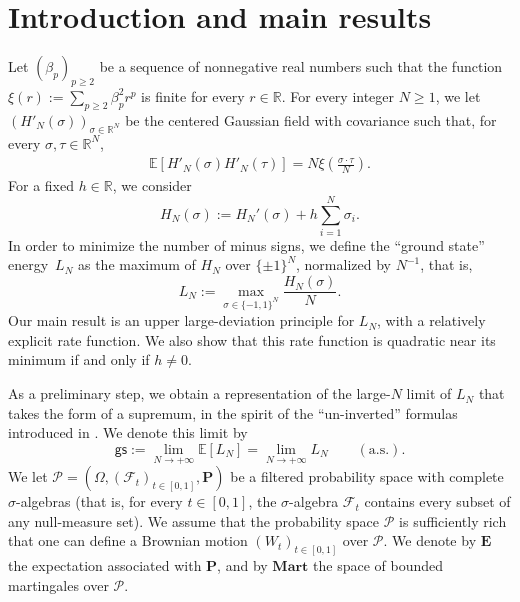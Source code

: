\documentclass[11pt]{amsart}
\theoremstyle{remark}
\theoremstyle{definition}
\numberwithin{equation}{section}
\numberwithin{proposition}{section}
\numberwithin{figure}{section}
\numberwithin{table}{section}
\newcommand{\R}{\mathbb{R}}
\newcommand{\E}{\mathbb{E}}
\newcommand{\EE}{\mathbf{E}}
\newcommand{\PP}{\mathbf{P}}
\renewcommand{\ge}{\geqslant}
\newcommand{\Ll}{\left}
\newcommand{\Rr}{\right}
\newcommand{\1}{\mathbf{1}}
\newcommand{\mcl}{\mathcal}
\newcommand{\msf}{\mathsf}
\newcommand{\msc}{\mathscr}
\newcommand{\be}{\beta}
\newcommand{\si}{\sigma}
\newcommand{\bmart}{\mathbf{Mart}}
\begin{document}
\section{Introduction and main results}\label{s.intro}


Let $(\beta_p)_{p \ge 2}$ be a sequence of nonnegative real numbers such that the function $\xi(r) := \sum_{p \ge 2} \be_p^2 r^p$ is finite for every $r \in \R$. For every integer $N \ge 1$, we let $(H'_N(\sigma))_{\sigma \in \R^N}$ be the centered Gaussian field with covariance such that, for every $\si, \tau \in \R^N$,
\begin{align}\label{e.H'_N(sigma)=}
\E [H'_N(\sigma) H'_N(\tau)] = N \xi \Ll( \frac{\sigma \cdot \tau}{N} \Rr) .
\end{align}
For a fixed $h\in \R$, we consider 
\begin{equation}
\label{e.def.HN}
H_N(\sigma) := H_N'(\sigma) + h \sum_{i = 1}^N \sigma_i.
\end{equation}
In order to minimize the number of minus signs, we define the ``ground state'' energy~$L_N$ as the maximum of $H_N$ over $\{\pm 1\}^N$, normalized by $N^{-1}$, that is,
\begin{equation}\label{e.L_N=}
L_N := \max_{\sigma \in \{-1,1\}^N} \frac{H_N(\sigma)}{N}. 
\end{equation}
Our main result is an upper large-deviation principle for $L_N$, with a relatively explicit rate function. We also show that this rate function is quadratic near its minimum if and only if $h \neq 0$. 

As a preliminary step, we obtain a representation of the large-$N$ limit of $L_N$ that takes the form of a supremum, in the spirit of the ``un-inverted'' formulas introduced in \cite{mourrat2025uninverting}. We denote this limit by
\begin{equation*}  %
\msf{gs} := \lim_{ N \to + \infty} \E[L_N] = \lim_{ N \to + \infty} L_N \qquad (\text{a.s.}).
\end{equation*}
We let $\mathscr P = (\Omega,(\mcl F_t)_{t \in [0,1]}, \PP)$ be a filtered probability space with complete $\sigma$-algebras (that is, for every $t \in [0,1]$, the $\sigma$-algebra $\mcl F_t$ contains every subset of any null-measure set). We assume that the probability space $\mathscr P$ is sufficiently rich that one can define a Brownian motion $(W_t)_{t \in [0,1]}$ over $\mathscr P$. We denote by $\EE$ the expectation associated with $\PP$, and by $\bmart$ the space of bounded martingales over $\msc P$. 
\end{document}
